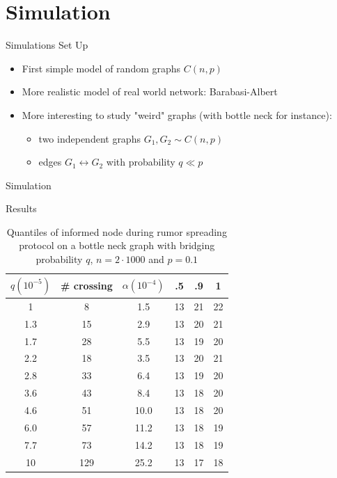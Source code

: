\documentclass{beamer}
\begin{document}
\section{Simulation}

\frame{\sectionpage}

\begin{frame}{Simulations Set Up}
\begin{itemize}
  \item 
    First simple model of random graphs $C(n,p)$

  \item
    More realistic model of real world network: Barabasi-Albert
  \item More interesting to study "weird" graphs (with bottle neck for instance): 
  \begin{itemize}
    \item two independent graphs $G_1, G_2 \sim C(n,p)$
    \item edges $G_1 \leftrightarrow G_2$ with probability $q \ll p$
  \end{itemize}
\end{itemize}

\end{frame}

\begin{frame}{Simulation}
  
\end{frame}

\begin{frame}{Results}
  \begin{table}
\centering
\begin{tabular}{c|c|c||c|c|c}
  $q (10^{-5})$ & \# crossing & $\alpha (10^{-4})$ & .5 & .9 & 1\\
  \hline
  1 & 8 & 1.5 & 13 & 21 & 22 \\
1.3 & 15 & 2.9 & 13 & 20 & 21 \\
1.7 & 28 & 5.5 & 13 & 19 & 20 \\
2.2 & 18 & 3.5 & 13 & 20 & 21 \\
2.8 & 33 & 6.4 & 13 & 19 & 20 \\
3.6 & 43 & 8.4 & 13 & 18 & 20 \\
4.6 & 51 & 10.0 & 13 & 18 & 20 \\
6.0 & 57 & 11.2 & 13 & 18 & 19 \\
7.7 & 73 & 14.2 & 13 & 18 & 19 \\
10 & 129 & 25.2 & 13 & 17 & 18 \\
\end{tabular}
\caption{Quantiles of informed node during rumor spreading protocol on a bottle neck graph with bridging probability $q$, $n = 2 \cdot 1000$ and $p = 0.1$}
\label{tab:quantiles}
\end{table}
\end{frame}
\end{document}
